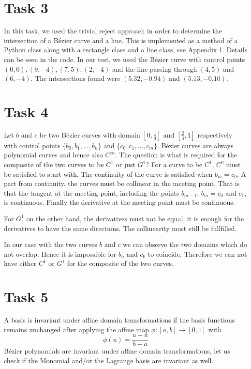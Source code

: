 \documentclass[]{article}
\begin{document}
\section*{Task 3}
In this task, we used the trivial reject approach in order to determine the intersection of a B\'ezier curve and a line. This is implemented as a method of a Python class along with a rectangle class and a line class, see Appendix 1. Details can be seen in the code. In our test, we used the B\'ezier curve with control points $(0, 0), (9, -4), (7, 5), (2, -4)$ and the line passing through $(4, 5)$ and $(6, -4)$. The intersections found were $(5.32, -0.94)$ and $(5.13, -0.10)$.

\section*{Task 4}
Let $b$ and $c$ be two B\'ezier curves with domain $[0,\frac{1}{3}]$ and $[\frac{2}{3},1]$ respectively with control points $\{b_0,b_1,...,b_n\}$ and $\{c_0,c_1,...,c_m\}$. B\'ezier curves are always polynomial curves and hence also $C^\infty$. The question is what is required for the composite of the two curves to be $C^1$ or just $G^1$? For a curve to be $C^1$, $C^0$ must be satisfied to start with. The continuity of the curve is satisfied when $b_m=c_0$. A part from continuity, the curves must be collinear in the meeting point. That is that the tangent at the meeting point, including the points  $b_{m-1}$, $b_m=c_0$ and $c_1$, is continuous. Finally the derivative at the meeting point must be continuous.

For $G^1$ on the other hand, the derivatives must not be equal, it is enough for the derivatives to have the same directions. The collinearity must still be fullfilled.

In our case with the two curves $b$ and $c$ we can observe the two domains which do not overlap. Hence it is impossible for $b_n$ and $c_0$ to coincide. Therefore we can not have either $C^1$ or $G^1$ for the composite of the two curves.

\section*{Task 5}
A basis is invariant under affine domain transformations if the basis functions remains unchanged after applying the affine map $\phi:[a,b] \rightarrow [0,1]$ with $$\phi(u)=\frac{u-a}{b-a}$$
B\'ezier polynomials are invariant under affine domain transformations, let us check if the Monomial and/or the Lagrange basis are invariant as well.
\end{document}
